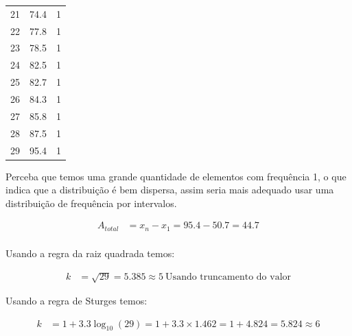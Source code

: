 \begin{parts}
\begin{solution}
\begin{table}[H]
\begin{tabular}{rlr}
                21 & 74.4   & 1    \\
                22 & 77.8   & 1    \\
                23 & 78.5   & 1    \\
                24 & 82.5   & 1    \\
                25 & 82.7   & 1    \\
                26 & 84.3   & 1    \\
                27 & 85.8   & 1    \\
                28 & 87.5   & 1    \\
                29 & 95.4   & 1    \\
                \hline
            \end{tabular}
        \end{table}

        Perceba que temos uma grande quantidade de elementos com frequência 1, o que indica que a distribuição é bem dispersa, assim seria mais adequado usar uma distribuição de frequência por intervalos.

        \begin{equation*}
            \begin{split}
                A_{total} & = x_n - x_1 = 95.4 - 50.7 = 44.7 \\
            \end{split}
        \end{equation*}

        Usando a regra da raiz quadrada temos:

        \begin{equation*}
            \begin{split}
                k & = \sqrt{29} = 5.385 \approx 5 \ \text{Usando truncamento do valor}
            \end{split}
        \end{equation*}

        Usando a regra de Sturges temos:

        \begin{equation*}
            \begin{split}
                k & = 1 + 3.3 \log_{10}(29) = 1 + 3.3 \times 1.462 = 1 + 4.824 = 5.824 \approx 6 \\
            \end{split}
        \end{equation*}

        \pagebreak


\end{solution}
\end{parts}
